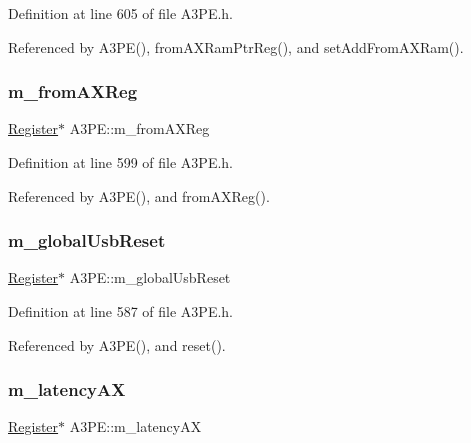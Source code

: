 Definition at line 605 of file A3\+P\+E.\+h.



Referenced by A3\+P\+E(), from\+A\+X\+Ram\+Ptr\+Reg(), and set\+Add\+From\+A\+X\+Ram().

\mbox{\label{classA3PE_acbfe708ac0a81243959c96124f192b9e}} 
\subsubsection{\texorpdfstring{m\+\_\+from\+A\+X\+Reg}{m\_fromAXReg}}
{\footnotesize\ttfamily \hyperlink{classRegister}{Register}$\ast$ A3\+P\+E\+::m\+\_\+from\+A\+X\+Reg\hspace{0.3cm}{\ttfamily [private]}}



Definition at line 599 of file A3\+P\+E.\+h.



Referenced by A3\+P\+E(), and from\+A\+X\+Reg().

\mbox{\label{classA3PE_abd71e0c273f9e211e1a9302019129aff}} 
\subsubsection{\texorpdfstring{m\+\_\+global\+Usb\+Reset}{m\_globalUsbReset}}
{\footnotesize\ttfamily \hyperlink{classRegister}{Register}$\ast$ A3\+P\+E\+::m\+\_\+global\+Usb\+Reset\hspace{0.3cm}{\ttfamily [private]}}



Definition at line 587 of file A3\+P\+E.\+h.



Referenced by A3\+P\+E(), and reset().

\mbox{\label{classA3PE_a061472eb539bb6ac99f4fa11a760eeaf}} 
\subsubsection{\texorpdfstring{m\+\_\+latency\+AX}{m\_latencyAX}}
{\footnotesize\ttfamily \hyperlink{classRegister}{Register}$\ast$ A3\+P\+E\+::m\+\_\+latency\+AX\hspace{0.3cm}{\ttfamily [private]}}



